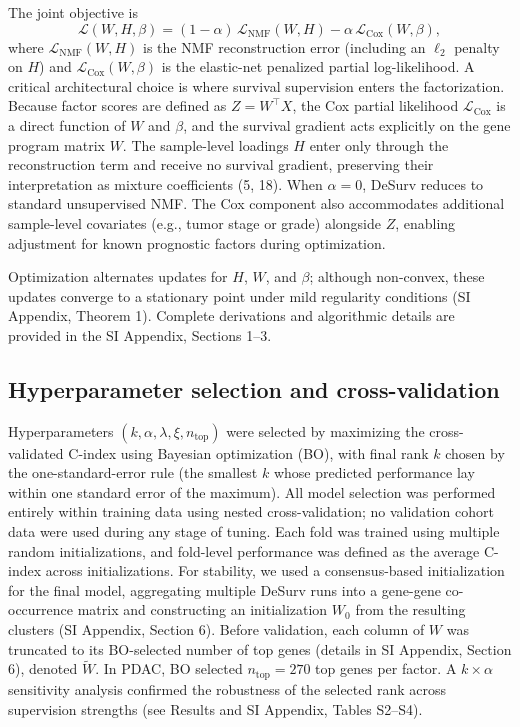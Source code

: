 \documentclass[9pt,twocolumn,twoside,]{pnas-new}
\begin{document}
The joint objective is \begin{equation}
\label{eqn:desurv}
\mathcal{L}(W,H,\beta) =
(1-\alpha)\,\mathcal{L}_{\mathrm{NMF}}(W,H)
- \alpha\,\mathcal{L}_{\mathrm{Cox}}(W,\beta),
\end{equation} where \(\mathcal{L}_{\mathrm{NMF}}(W,H)\) is the NMF
reconstruction error (including an \(\ell_2\) penalty on \(H\)) and
\(\mathcal{L}_{\mathrm{Cox}}(W,\beta)\) is the elastic-net penalized
partial log-likelihood. A critical architectural choice is where
survival supervision enters the factorization. Because factor scores are
defined as \(Z = W^\top X\), the Cox partial likelihood
\(\mathcal{L}_{\mathrm{Cox}}\) is a direct function of \(W\) and
\(\beta\), and the survival gradient acts explicitly on the gene program
matrix \(W\). The sample-level loadings \(H\) enter only through the
reconstruction term and receive no survival gradient, preserving their
interpretation as mixture coefficients (5, 18). When \(\alpha = 0\),
DeSurv reduces to standard unsupervised NMF. The Cox component also
accommodates additional sample-level covariates (e.g., tumor stage or
grade) alongside \(Z\), enabling adjustment for known prognostic factors
during optimization.

Optimization alternates updates for \(H\), \(W\), and \(\beta\);
although non-convex, these updates converge to a stationary point under
mild regularity conditions (SI Appendix, Theorem 1). Complete
derivations and algorithmic details are provided in the SI Appendix,
Sections 1--3.

\subsection{Hyperparameter selection and
cross-validation}\label{hyperparameter-selection-and-cross-validation}

Hyperparameters \((k,\alpha,\lambda,\xi,n_{\text{top}})\) were selected
by maximizing the cross-validated C-index using Bayesian optimization
(BO), with final rank \(k\) chosen by the one-standard-error rule (the
smallest \(k\) whose predicted performance lay within one standard error
of the maximum). All model selection was performed entirely within
training data using nested cross-validation; no validation cohort data
were used during any stage of tuning. Each fold was trained using
multiple random initializations, and fold-level performance was defined
as the average C-index across initializations. For stability, we used a
consensus-based initialization for the final model, aggregating multiple
DeSurv runs into a gene-gene co-occurrence matrix and constructing an
initialization \(W_0\) from the resulting clusters (SI Appendix, Section
6). Before validation, each column of \(W\) was truncated to its
BO-selected number of top genes (details in SI Appendix, Section 6),
denoted \(\widetilde{W}\). In PDAC, BO selected \(n_{\text{top}} = 270\)
top genes per factor. A \(k \times \alpha\) sensitivity analysis
confirmed the robustness of the selected rank across supervision
strengths (see Results and SI Appendix, Tables S2--S4).
\end{document}
